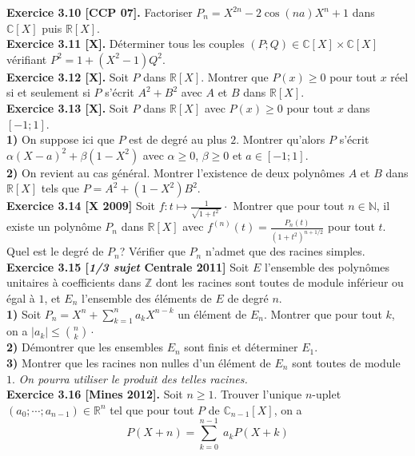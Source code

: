 \documentclass[a4paper,12pt,francais]{article}
\newcommand{\field}[1]{\mathbb{#1}}
\newcommand{\N}{\field{N}}
\newcommand{\Z}{\field{Z}}
\newcommand{\R}{\field{R}}
\newcommand{\C}{\field{C}}
\begin{document}
\noindent
{\bf Exercice 3.10 [CCP 07].} Factoriser $P_n= X^{2n}-2 \cos(na) X^n+1$ dans $\C[X]$ puis $\R[X]$.\\

\noindent
{\bf Exercice 3.11 [X].} Déterminer tous les couples $(P;Q)\in \C[X] \times \C[X]$ vérifiant $P^2=1+(X^2-1)Q^2$.\\

\noindent
{\bf Exercice 3.12 [X].} Soit $P$ dans $\R[X]$. Montrer que $P(x)\geqslant 0$ pour tout $x$ réel si et seulement si $P$ s'écrit $A^2+B^2$ avec $A$ et $B$ dans $\R[X]$.\\

\noindent
{\bf Exercice 3.13 [X].} Soit $P$ dans $\R[X]$ avec $P(x)\geqslant 0$ pour tout $x$ dans $[-1;1]$.\\
{\bf 1)} On suppose ici que $P$ est de degré au plus $2$. Montrer qu'alors $P$ s'écrit $\alpha(X-a)^2+\beta(1-X^2)$ avec $\alpha \geqslant 0$, $\beta \geqslant 0$ et $a \in [-1;1]$.\\
{\bf 2)} On revient au cas général. Montrer l'existence de deux polynômes $A$ et $B$ dans $\R[X]$ tels que $P=A^2+(1-X^2)B^2$.\\ 

\noindent
{\bf Exercice 3.14 [X 2009]} Soit $f:t\mapsto \frac{1}{ \sqrt{1+t^2\;} }\cdot$ Montrer que pour tout $n\in \N$, il existe un polynôme $P_n$ dans $\R[X]$ avec $f^{(n)}(t) =\frac{P_n(t)}{(1+t^2)^{n+1/2}}$ pour tout $t$. Quel est le degré de $P_n$? Vérifier que $P_n$ n'admet que des racines simples.\\

\noindent
{\bf Exercice 3.15 [{\it 1/3 sujet} Centrale 2011]} Soit $E$ l'ensemble des polynômes unitaires à coefficients dans $\Z$ dont les racines sont toutes de module inférieur ou égal à $1$, et $E_n$ l'ensemble des éléments de $E$ de degré $n$.\\
{\bf 1)} Soit $\displaystyle P_n=X^n+\sum_{k=1}^n a_k X^{n-k}$ un élément de $E_n$. Montrer que pour tout $k$, on a $|a_k| \leqslant \binom{n}{k}\cdot$\\
{\bf 2)} Démontrer que les ensembles $E_n$ sont finis et déterminer $E_1$.\\
{\bf 3)} Montrer que les racines non nulles d'un élément de $E_n$ sont toutes de module $1$. {\it On pourra utiliser le produit des telles racines.}\\

\noindent
{\bf Exercice 3.16 [Mines 2012].} Soit $n\geqslant 1$. Trouver l'unique $n$-uplet $(a_0;\cdots;a_{n-1})\in \R^n$ tel que pour tout $P$ de $\C_{n-1}[X]$, on a 
$$P(X+n)=\sum_{k=0}^{n-1} \; a_k P(X+k)$$
\end{document}
